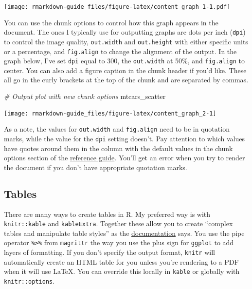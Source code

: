 \documentclass[
]{book}
\newenvironment{Shaded}{\begin{snugshade}}{\end{snugshade}}
\newcommand{\CommentTok}[1]{\textcolor[rgb]{0.56,0.35,0.01}{\textit{#1}}}
\newcommand{\NormalTok}[1]{#1}
\begin{document}
\texttt{[image: rmarkdown-guide\_files/figure-latex/content\_graph\_1-1.pdf]}

You can use the chunk options to control how this graph appears in the document. The ones I typically use for outputting graphs are dots per inch (\texttt{dpi}) to control the image quality, \texttt{out.width} and \texttt{out.height} with either specific units or a percentage, and \texttt{fig.align} to change the alignment of the output. In the graph below, I've set \texttt{dpi} equal to 300, the \texttt{out.width} at 50\%, and \texttt{fig.align} to center. You can also add a figure caption in the chunk header if you'd like. These all go in the curly brackets at the top of the chunk and are separated by commas.

\begin{Shaded}
\begin{Highlighting}[]
\CommentTok{# Output plot with new chunk options}
\NormalTok{mtcars_scatter}
\end{Highlighting}
\end{Shaded}

\begin{center}\texttt{[image: rmarkdown-guide\_files/figure-latex/content\_graph\_2-1]} \end{center}

As a note, the values for \texttt{out.width} and \texttt{fig.align} need to be in quotation marks, while the value for the \texttt{dpi} setting doesn't. Pay attention to which values have quotes around them in the column with the default values in the chunk options section of the \href{https://rstudio.com/wp-content/uploads/2015/03/rmarkdown-reference.pdf}{reference guide}. You'll get an error when you try to render the document if you don't have appropriate quotation marks.

\hypertarget{tables}{%
\subsection{Tables}\label{tables}}

There are many ways to create tables in R. My preferred way is with \texttt{knitr::kable} and \texttt{kableExtra}. Together these allow you to create ``complex tables and manipulate table styles'' as the \href{https://cran.r-project.org/web/packages/kableExtra/vignettes/awesome_table_in_html.html}{documentation} says. You use the pipe operator \texttt{\%\textgreater{}\%} from \texttt{magrittr} the way you use the plus sign for \texttt{ggplot} to add layers of formatting. If you don't specify the output format, \texttt{knitr} will automatically create an HTML table for you unless you're rendering to a PDF when it will use LaTeX. You can override this locally in \texttt{kable} or globally with \texttt{knitr::options}.
\end{document}
